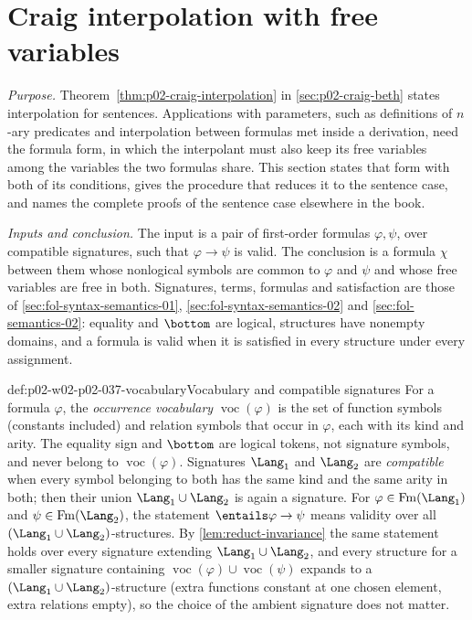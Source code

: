 \section{Craig interpolation with free variables}
\label{sec:p02-w02-p02-037-craig}

\emph{Purpose.}  Theorem~\ref{thm:p02-craig-interpolation} in
\cref{sec:p02-craig-beth} states interpolation for sentences.  Applications
with parameters, such as definitions of \(n\)-ary predicates and
interpolation between formulas met inside a derivation, need the formula
form, in which the interpolant must also keep its free variables among the
variables the two formulas share.  This section states that form with both
of its conditions, gives the procedure that reduces it to the sentence case,
and names the complete proofs of the sentence case elsewhere in the book.

\emph{Inputs and conclusion.}  The input is a pair of first-order formulas
\(\varphi,\psi\), over compatible signatures, such that
\(\varphi\to\psi\) is valid.  The conclusion is a formula \(\chi\) between
them whose nonlogical symbols are common to \(\varphi\) and \(\psi\) and
whose free variables are free in both.  Signatures, terms, formulas and
satisfaction are those of \cref{sec:fol-syntax-semantics-01},
\cref{sec:fol-syntax-semantics-02} and \cref{sec:fol-semantics-02}:
equality and \(\bottom\) are logical, structures have nonempty domains, and
a formula is valid when it is satisfied in every structure under every
assignment.

\begin{hbconvention}{def:p02-w02-p02-037-vocabulary}{Vocabulary and compatible signatures}
For a formula \(\varphi\), the \emph{occurrence vocabulary}
\(\operatorname{voc}(\varphi)\) is the set of function symbols (constants
included) and relation symbols that occur in \(\varphi\), each with its kind
and arity.  The equality sign and \(\bottom\) are logical tokens, not
signature symbols, and never belong to \(\operatorname{voc}(\varphi)\).
Signatures \(\Lang_1\) and \(\Lang_2\) are \emph{compatible} when every
symbol belonging to both has the same kind and the same arity in both; then
their union \(\Lang_1\cup\Lang_2\) is again a signature.  For
\(\varphi\in\operatorname{Fm}(\Lang_1)\) and \(\psi\in\operatorname{Fm}(\Lang_2)\), the statement
\(\entails\varphi\to\psi\) means validity over all
\((\Lang_1\cup\Lang_2)\)-structures.  By \cref{lem:reduct-invariance} the
same statement holds over every signature extending \(\Lang_1\cup\Lang_2\),
and every structure for a smaller signature containing
\(\operatorname{voc}(\varphi)\cup\operatorname{voc}(\psi)\) expands to a
\((\Lang_1\cup\Lang_2)\)-structure (extra functions constant at one chosen
element, extra relations empty), so the choice of the ambient signature
does not matter.
\end{hbconvention}


